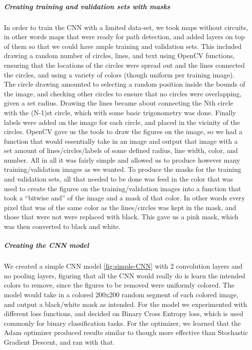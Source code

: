 \documentclass[a4paper,12pt]{extarticle}
\begin{document}
\subparagraph{Creating training and validation sets with masks\\}

In order to train the CNN with a limited data-set, we took maps without circuits, in other words maps that were ready for path detection, and added layers on top of them so that we could have ample training and validation sets. This included drawing a random number of circles, lines, and text using OpenCV functions, ensuring that the locations of the circles were spread out and the lines connected the circles, and using a variety of colors (though uniform per training image). The circle drawing amounted to selecting a random position inside the bounds of the image, and checking other circles to ensure that no circles were overlapping, given a set radius. Drawing the lines became about connecting the Nth circle with the (N-1)st circle, which with some basic trigonometry was done. Finally labels were added on the image for each circle, and placed in the vicinity of the circles. OpenCV gave us the tools to draw the figures on the image, so we had a function that would essentially take in an image and output that image with a set amount of lines/circles/labels of some defined radius, line width, color, and number. All in all it was fairly simple and allowed us to produce however many training/validation images as we wanted. To produce the masks for the training and validation sets, all that needed to be done was feed in the color that was used to create the figures on the training/validation images into a function that took a “bitwise and” of the image and a mask of that color. In other words every pixel that was of the same color as the lines/circles was kept in the mask, and those that were not were replaced with black. This gave us a pink mask, which was then converted to black and white.

\subparagraph{Creating the CNN model\\}
We created a simple CNN model \ref{fig:simple-CNN} with 2 convolution layers and no pooling layers, figuring that all the CNN would really do is learn the intended colors to remove, since the figures to be removed were uniformly colored. The model would take in a colored 200x200 random segment of each colored image, and output a black/white mask as intended. For the model we experimented with different loss functions, and decided on Binary Cross Entropy loss, which is used commonly for binary classification tasks. For the optimizer, we learned that the Adam optimizer produced results similar to though more effective than Stochastic Gradient Descent, and ran with that.
\end{document}
